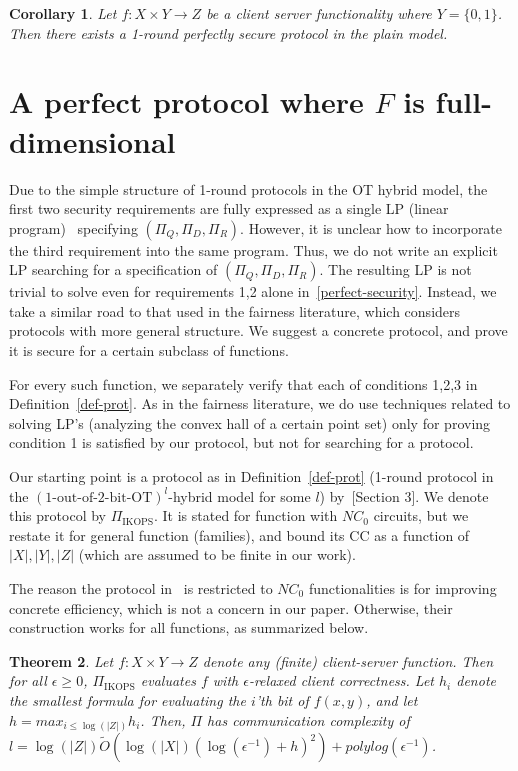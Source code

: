 \documentclass[a4paper]{article}
\newtheorem{theorem}{Theorem}[section]
\newtheorem{corollary}[theorem]{Corollary}
\newcommand{\OT}[2]{#1\text{-out-of-}#2\text{-bit-OT}}
\begin{document}
\begin{corollary}
	Let $f:X\times Y\rightarrow Z$ be a client server functionality where $Y=\{0,1\}$. Then there exists a 1-round perfectly secure protocol in the plain model.
\end{corollary}



\section{A perfect protocol where $F$ is full-dimensional}
Due to the simple structure of 1-round protocols in the OT hybrid model,
the first two security requirements are fully expressed as a single LP (linear program)~\cite{Kan39, Dantzig60} specifying $(\Pi_Q,\Pi_D,\Pi_R)$. However, it is unclear how to incorporate the third requirement into the same program. Thus, we do not write an explicit LP searching for a specification of $(\Pi_Q,\Pi_D,\Pi_R)$.
The resulting LP is not trivial to solve even for requirements 1,2 alone in~\ref{perfect-security}. 
Instead, we take a similar road to that used in the fairness literature, which considers protocols with more general structure. We suggest a concrete protocol, and prove it is secure for a certain subclass of functions. 

For every such function, we separately verify that each of conditions 1,2,3 in Definition~\ref{def-prot}.
As in the fairness literature, we do use techniques related to solving LP's (analyzing the convex hall of a certain point set) only for proving condition 1 is satisfied by our protocol, but not for searching for a protocol.

Our starting point is a protocol as in Definition~\ref{def-prot} (1-round protocol in the $(\OT{1}{2})^l$-hybrid model for some $l$) by~\cite{IKOPS11}[Section 3]. We denote this protocol by $\Pi_{\text{IKOPS}}$. It is stated for function with $NC_0$ circuits, but we restate it for general function (families), and bound its CC as a function of $|X|,|Y|,|Z|$ (which are assumed to be finite in our work). 

The reason the protocol in~\cite{IKOPS11} is restricted to $NC_0$ functionalities is for improving concrete efficiency, which is not a concern in our paper.
Otherwise, their construction works for all functions, as summarized below.

\begin{theorem}
	Let $f:X\times Y\rightarrow Z$ denote any (finite) client-server function.
	Then for all $\epsilon \geq 0$, $\Pi_{\text{IKOPS}}$ evaluates $f$ with $\epsilon$-relaxed client correctness. 
	Let $h_i$ denote the smallest formula for evaluating the $i$'th bit of $f(x,y)$, and let $h = max_{i\leq \log(|Z|)} h_i$.
	Then, $\Pi$ has communication complexity of $l=\log(|Z|)\tilde{O}(\log(|X|) (\log({\epsilon^{-1}})+h)^2)+polylog(\epsilon^{-1})$.
\end{theorem}
\end{document}
